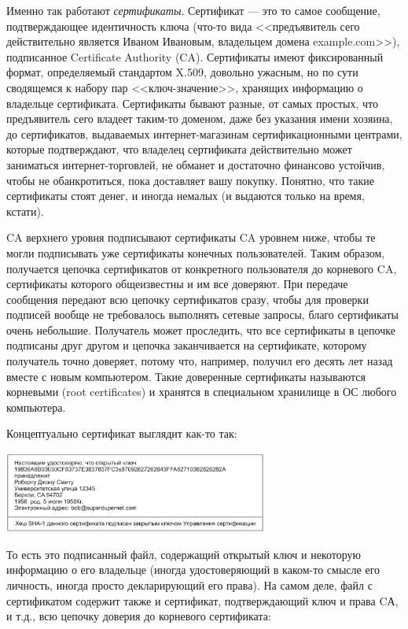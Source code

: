 \documentclass{../mcstext}
\begin{document}
Именно так работают \textit{сертификаты}. Сертификат --- это то самое сообщение, подтверждающее идентичность ключа (что-то вида <<предъявитель сего действительно является Иваном Ивановым, владельцем домена example.com>>), подписанное Certificate Authority (CA). Сертификаты имеют фиксированный формат, определяемый стандартом X.509, довольно ужасным, но по сути сводящемся к набору пар <<ключ-значение>>, хранящих информацию о владельце сертификата. Сертификаты бывают разные, от самых простых, что предъявитель сего владеет таким-то доменом, даже без указания имени хозяина, до сертификатов, выдаваемых интернет-магазинам сертификационными центрами, которые подтверждают, что владелец сертификата действительно может заниматься интернет-торговлей, не обманет и достаточно финансово устойчив, чтобы не обанкротиться, пока доставляет вашу покупку.  Понятно, что такие сертификаты стоят денег, и иногда немалых (и выдаются только на время, кстати).

CA верхнего уровня подписывают сертификаты CA уровнем ниже, чтобы те могли подписывать уже сертификаты конечных пользователей. Таким образом, получается цепочка сертификатов от конкретного пользователя до корневого CA, сертификаты которого общеизвестны и им все доверяют. При передаче сообщения передают всю цепочку сертификатов сразу, чтобы для проверки подписей вообще не требовалось выполнять сетевые запросы, благо сертификаты очень небольшие. Получатель может проследить, что все сертификаты в цепочке подписаны друг другом и цепочка заканчивается на сертификате, которому получатель точно доверяет, потому что, например, получил его десять лет назад вместе с новым компьютером. Такие доверенные сертификаты называются корневыми (root certificates) и хранятся в специальном хранилище в ОС любого компьютера.

Концептуально сертификат выглядит как-то так:

\begin{center}
    \includegraphics[width=0.65\textwidth]{certificate.png}
\end{center}

То есть это подписанный файл, содержащий открытый ключ и некоторую информацию о его владельце (иногда удостоверяющий в каком-то смысле его личность, иногда просто декларирующий его права). На самом деле, файл с сертификатом содержит также и сертификат, подтверждающий ключ и права CА, и т.д., всю цепочку доверия до корневого сертификата:
\end{document}
